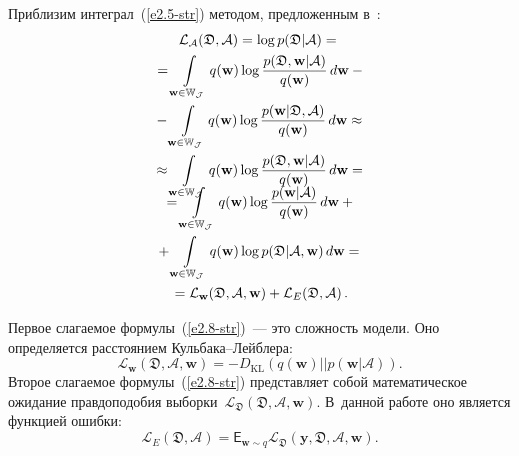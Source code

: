 \begin{multicols}{2}
Приблизим интеграл~(\ref{e2.5-str}) методом, предложенным в~\cite{bishop2006}:
\begin{multline*}
\mathcal{L}_{\mathcal{A}}(\mathfrak{D},\mathcal{A}) = \log 
p(\mathfrak{D}|\mathcal{A}) = {}\\
{} =\int\limits_{\mathbf{w}\in\mathbb{W_\mathcal{J}}} q(\mathbf{w}) \log 
\displaystyle\frac{\displaystyle p(\mathfrak{D}, \mathbf{w}|\mathcal{A})\mathstrut}{\displaystyle q(\mathbf{w})\mathstrut}\,d \mathbf{w} - {}\\
{}-
\int\limits_{\mathbf{w}\in\mathbb{W_\mathcal{J}}}  q(\mathbf{w}) \log 
\displaystyle\frac{\displaystyle p(\mathbf{w}|\mathfrak{D},\mathcal{A})\mathstrut}{\displaystyle q(\mathbf{w})\mathstrut}\,d \mathbf{w} \approx {}\\
{}\approx \int\limits_{\mathbf{w}\in\mathbb{W_\mathcal{J}}} q(\mathbf{w}) \log 
\displaystyle\frac{\displaystyle p(\mathfrak{D}, \mathbf{w}|\mathcal{A})\mathstrut}{\displaystyle q(\mathbf{w})\mathstrut}\,d \mathbf{w} = {}\\[-20pt]
\end{multline*}

\noindent
\begin{multline}
{}= \int\limits_{\mathbf{w}\in\mathbb{W_\mathcal{J}}} q(\mathbf{w}) \log 
\displaystyle\frac{\displaystyle p(\mathbf{w}| \mathcal{A})\mathstrut}{\displaystyle q(\mathbf{w})\mathstrut}\,d \mathbf{w} + {}\\
{}+
\int\limits_{\mathbf{w}\in\mathbb{W_\mathcal{J}}} q(\mathbf{w}) \log 
p(\mathfrak{D}|\mathcal{A}, \mathbf{w})\,d \mathbf{w}={}\\
{}=\mathcal{L}_\mathbf{w}(\mathfrak{D}, \mathcal{A}, 
\mathbf{w})+\mathcal{L}_{E}(\mathfrak{D},\mathcal{A})\,.
\label{e2.8-str}
\end{multline}

Первое слагаемое формулы~(\ref{e2.8-str})~--- это слож\-ность модели. Оно определяется 
расстоянием Куль\-ба\-ка--Лейб\-лера:
\begin{equation*}
\mathcal{L}_\mathbf{w}(\mathfrak{D}, \mathcal{A}, \mathbf{w}) = -
D_{\mathrm{KL}}\left(q(\textbf{w})||p(\textbf{w}|\mathcal{A})\right). 
\end{equation*}
Второе слагаемое формулы~(\ref{e2.8-str}) пред\-став\-ля\-ет собой математическое
ожидание правдоподобия 
выборки~$\mathcal{L}_\mathfrak{D}(\mathfrak{D},\mathcal{A}, \mathbf{w})$. 
В~данной работе оно является функцией ошибки:
\begin{equation*}
\mathcal{L}_{E}(\mathfrak{D},\mathcal{A}) = \mathsf{E}_{\mathbf{w}\sim  q}
\mathcal{L}_\mathfrak{D}(\mathbf{y}, \mathfrak{D}, \mathcal{A}, \mathbf{w}). 
\end{equation*}


\end{multicols}
